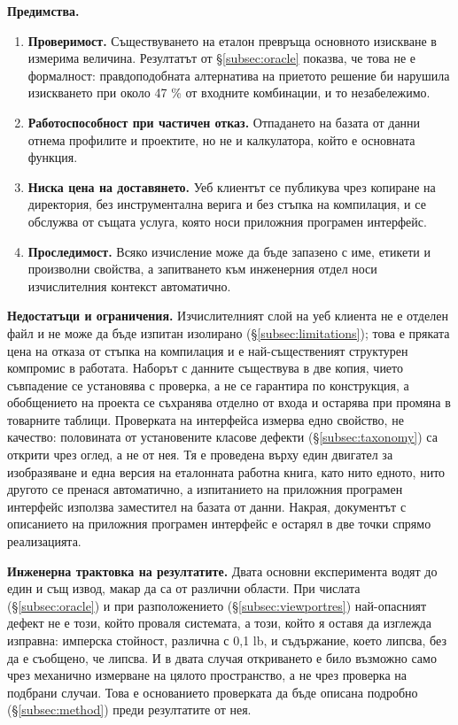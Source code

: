 \textbf{Предимства.}
\begin{enumerate}[topsep=2pt,itemsep=2pt,leftmargin=*]
\item \textbf{Проверимост.} Съществуването на еталон превръща основното изискване в
      измерима величина. Резултатът от §\ref{subsec:oracle} показва, че това не е
      формалност: правдоподобната алтернатива на приетото решение би нарушила
      изискването при около 47 \% от входните комбинации, и то незабележимо.
\item \textbf{Работоспособност при частичен отказ.} Отпадането на базата от данни
      отнема профилите и проектите, но не и калкулатора, който е основната функция.
\item \textbf{Ниска цена на доставянето.} Уеб клиентът се публикува чрез копиране на
      директория, без инструментална верига и без стъпка на компилация, и се обслужва
      от същата услуга, която носи приложния програмен интерфейс.
\item \textbf{Проследимост.} Всяко изчисление може да бъде запазено с име, етикети и
      произволни свойства, а запитването към инженерния отдел носи изчислителния
      контекст автоматично.
\end{enumerate}

\textbf{Недостатъци и ограничения.} Изчислителният слой на уеб клиента не е отделен
файл и не може да бъде изпитан изолирано (§\ref{subsec:limitations}); това е пряката
цена на отказа от стъпка на компилация и е най-същественият структурен компромис в
работата. Наборът с данните съществува в две копия, чието съвпадение се установява с
проверка, а не се гарантира по конструкция, а обобщението на проекта се съхранява
отделно от входа и остарява при промяна в товарните таблици. Проверката на интерфейса
измерва едно свойство, не качество: половината от установените класове дефекти
(§\ref{subsec:taxonomy}) са открити чрез оглед, а не от нея. Тя е проведена върху един
двигател за изобразяване и една версия на еталонната работна книга, като нито едното,
нито другото се пренася автоматично, а изпитанието на приложния програмен интерфейс
използва заместител на базата от данни. Накрая, документът с описанието на приложния
програмен интерфейс е остарял в две точки спрямо реализацията.

\textbf{Инженерна трактовка на резултатите.} Двата основни експеримента водят до един
и същ извод, макар да са от различни области. При числата (§\ref{subsec:oracle}) и при
разположението (§\ref{subsec:viewportres}) най-опасният дефект не е този, който проваля
системата, а този, който я оставя да изглежда изправна: имперска стойност, различна с
0{,}1 lb, и съдържание, което липсва, без да е съобщено, че липсва. И в двата случая
откриването е било възможно само чрез механично измерване на цялото пространство, а
не чрез проверка на подбрани случаи. Това е основанието проверката да бъде описана
подробно (§\ref{subsec:method}) преди резултатите от нея.

